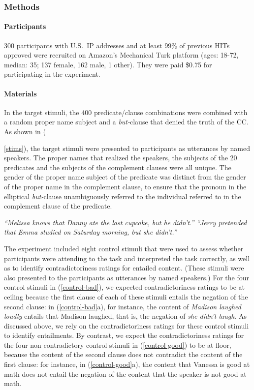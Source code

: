 \documentclass[11pt,fleqn]{article}
\newcommand{\6}{\mbox{$[\hspace*{-.6mm}[$}}
\newcommand{\9}{\mbox{$]\hspace*{-.6mm}]$}}
\begin{document}
\subsubsection{Methods}

\paragraph{Participants} 300 participants with U.S.\ IP addresses and at least 99\% of previous HITs approved were recruited on Amazon's Mechanical Turk platform (ages: 18-72, median: 35; 137 female, 162 male, 1 other). They were paid \$0.75 for participating in the experiment.

\paragraph{Materials} In the target stimuli, the 400 predicate/clause combinations were combined with a random proper name subject and a {\em but-}clause that denied the truth of the CC. As shown in ({\ref{stims}), the target stimuli were presented to participants as utterances by named speakers. The proper names that realized the speakers, the subjects of the 20 predicates and the subjects of the complement clauses were all unique. The gender of the proper name subject of the predicate was distinct from the gender of the proper name in the complement clause, to ensure that the pronoun in the elliptical {\em but-}clause unambiguously referred to the individual referred to in the complement clause of the predicate.

\begin{exe}
\ex\label{stims}
\begin{xlist}
 {\em ``Melissa knows that Danny ate the last cupcake, but he didn't.''}
 {\em ``Jerry pretended that Emma studied on Saturday morning, but she didn't.''}
\end{xlist}
\end{exe}

The experiment  included eight control stimuli that were used to assess whether participants were attending to the task and interpreted the task correctly, as well as to identify contradictoriness ratings for entailed content. (These stimuli were also presented to the participants as utterances by named speakers.) For the four control stimuli in (\ref{control-bad}), we expected contradictoriness ratings to be at ceiling because the first clause of each of these stimuli entails the negation of the second clause: in (\ref{control-bad}a), for instance, the content of {\em Madison laughed loudly} entails that Madison laughed, that is, the negation of {\em she didn't laugh}. As discussed above, we rely on the contradictoriness ratings for these control stimuli to identify entailments. By contrast, we expect the contradictoriness ratings for the four non-contradictory control stimuli in (\ref{control-good}) to be at floor, because the content of the second clause does not contradict the content of the first clause: for instance, in (\ref{control-good}a), the content that Vanessa is good at math does not entail the negation of the content that the speaker is not good at math. 

}
\end{document}
